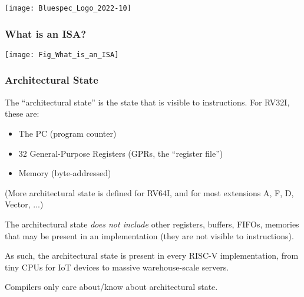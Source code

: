 



\date{L2: Overview of the RISC-V ISA}





\begin{frame}
 \titlepage

 \begin{center}
  \texttt{[image: Bluespec\_Logo\_2022-10]}
 \end{center}
\end{frame}





\begin{frame}
\frametitle{What is an ISA?}

\begin{center}
\texttt{[image: Fig\_What\_is\_an\_ISA]}
\end{center}

\end{frame}


\begin{frame}
\frametitle{Architectural State}

The ``architectural state'' is the state that is visible to
instructions.  For RV32I, these are:

{\footnotesize
  \begin{itemize}
  \item The PC (program counter)
  \item 32 General-Purpose Registers (GPRs, the ``register file'')
  \item Memory (byte-addressed)
  \end{itemize}}

{\footnotesize (More architectural state is defined for RV64I, and for
  most extensions A, F, D, Vector, ...)}

\vspace{1ex}

The architectural state \emph{does not include} other registers,
buffers, FIFOs, memories that may be present in an implementation
(they are not visible to instructions).

As such, the architectural state is present in every RISC-V
implementation, from tiny CPUs for IoT devices to massive
warehouse-scale servers.

Compilers only care about/know about architectural state.

\end{frame}

